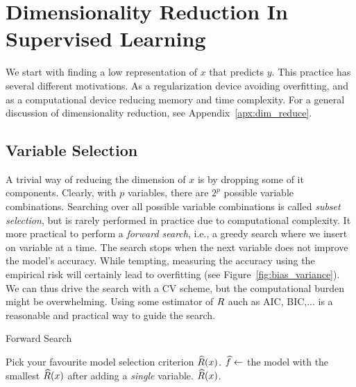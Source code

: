 
\section{Dimensionality Reduction In Supervised Learning}
\label{sec:dim_reduce_supervised}
We start with finding a low representation of $x$ that predicts $y$.
This practice has several different motivations. As a regularization device avoiding overfitting, and  as a computational device reducing memory and time complexity. 
For a general discussion of dimensionality reduction, see Appendix~\ref{apx:dim_reduce}.



\subsection{Variable Selection}
A trivial way of reducing the dimension of $x$ is by dropping some of it components. 
Clearly, with $p$ variables, there are $2^p$ possible variable combinations. Searching over all possible variable combinations is called \emph{subset selection}, but is rarely performed in practice due to computational complexity. It more practical to perform a \emph{forward search}, i.e., a greedy search where we insert on variable at a time.
The search stops when the next variable does not improve the model's accuracy. 
While tempting, measuring the accuracy using the empirical risk will certainly lead to overfitting (see Figure~\ref{fig:bias_variance}).
We can thus drive the search with a CV scheme, but the computational burden might be overwhelming. Using some estimator of $R$ auch as AIC, BIC,... is a reasonable and practical way to guide the search.


\begin{algorithm}[H]
\caption{Forward Search}
\begin{algorithmic}
\State Pick your favourite model selection criterion $\widehat{R}(x)$.
    \State $\widehat{f} \gets$ the model with the smallest $\widehat{R}(x)$ after adding a \emph{single} variable.
\EndWhile
\State \Return $\widehat{R}(x)$.
\end{algorithmic}
\end{algorithm}



